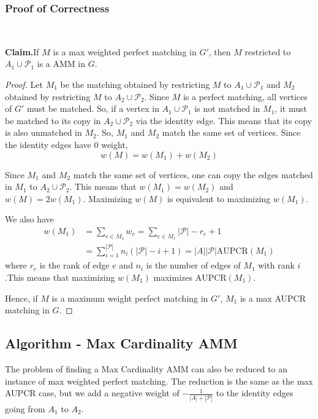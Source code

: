 \documentclass[letterpaper]{article} %
\newenvironment{claim}[1]{\par\noindent\textbf{Claim.}\space#1}{}
\begin{document}
\subsubsection{Proof of Correctness} ~\\
\begin{claim}
If $M$ is a max weighted perfect matching in $G'$, then $M$ restricted to $A_1 \cup \mathcal{P}_1$ is a AMM in $G$.
\end{claim}
\begin{proof}
Let $M_1$ be the matching obtained by restricting $M$ to $A_1 \cup \mathcal{P}_1$ and $M_2$ obtained by restricting $M$ to $A_2 \cup \mathcal{P}_2$. Since $M$ is a perfect matching, all vertices of $G'$ must be matched. So, if a vertex in $A_1 \cup \mathcal{P}_1$ is not matched in $M_1$, it must be matched to its copy in $A_2 \cup \mathcal{P}_2$ via the identity edge. This means that its copy is also unmatched in $M_2$. So, $M_1$ and $M_2$ match the same set of vertices.  Since the identity edges have 0 weight,
$$w(M) = w(M_1) + w(M_2)$$

Since $M_1$ and $M_2$ match the same set of vertices, one can copy the edges matched in $M_1$ to $A_2 \cup \mathcal{P}_2$. This means that $w(M_1) = w(M_2)$ and $w(M) = 2w(M_1)$. Maximizing $w(M)$ is equivalent to maximizing $w(M_1)$.

We also have
\begin{align*}\label{eq1}
  w(M_1) & = \sum_{e \in M_1} w_e = \sum_{e \in M_1} |\mathcal{P}|-r_e+1 \\
  & = \sum_{i=1}^{|\mathcal{P}|} n_i (|\mathcal{P}|-i+1) = |A||\mathcal{P}|\text{AUPCR}(M_1)
\end{align*}
where $r_e$ is the rank of edge $e$ and $n_i$ is the number of edges of $M_1$ with rank $i$.This means that maximizing $w(M_1)$ maximizes $\text{AUPCR}(M_1)$.

Hence, if $M$ is a maximum weight perfect matching in $G'$, $M_1$ is a max AUPCR matching in $G$.
\end{proof}

\subsection{Algorithm - Max Cardinality AMM}
The problem of finding a Max Cardinality AMM can also be reduced to an instance of max weighted perfect matching. The reduction is the same as the max AUPCR case, but we add a negative weight of $-\frac{1}{|A|+|\mathcal{P}|}$ to the identity edges going from $A_1$ to $A_2$.
\end{document}
